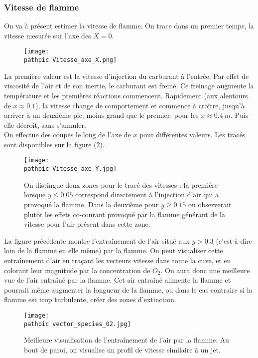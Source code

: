 \documentclass[a4paper,10pt]{article}
\newcommand\pathpic{/home/nsaura/Documents/new_doc/Latex_files/Pic/BE_combustion/}
\newcommand{\cad}{c'est-à-dire}
\newcommand\darker{\color{Maroon}}
\newcommand\black{\color{black}}
\begin{document}
{\darker \subsubsection*{Vitesse de flamme} \black
On va à présent estimer la vitesse de flamme. On trace dans un premier temps, la vitesse mesurée sur l'axe des $X=0$.

\begin{figure}[ht!]
\centering
\texttt{[image: \\pathpic Vitesse\_axe\_X.png]}
\caption{}
\label{}
\end{figure}

La première valeur est la vitesse d'injection du carburant à l'entrée. Par effet de viscosité de l'air et de son inertie, le carburant est freiné. Ce freinage augmente la température et les premières réactions commencent. Rapidement (aux alentours de $x \approx 0.1$), la vitesse change de comportement et commence à croître, jusqu'à arriver à un deuxième pic, moins grand que le premier, pour les $x \approx 0.4 \ m$. Puis elle décroît, sans s'annuler.\\
 On effectue des coupes le long de l'axe de $x$ pour différentes valeurs. Les tracés sont disponibles sur la figure (\ref{densite_vitesse}).
 
 \pagebreak
 \begin{figure}[ht!]
 \centering
 \texttt{[image: \\pathpic Vitesse\_axe\_Y.jpg]}
 \caption{On distingue deux zones pour le tracé des vitesses : la première lorsque $y \leq 0.05$ correspond directement à l'injection d'air qui a provoqué la flamme. Dans la deuxième pour $y \geq 0.15$ on observerait plutôt les effets co-courant provoqué par la flamme générant de la vitesse pour l'air présent dans cette zone.} 
 \label{densite_vitesse}
 \end{figure}
 
 \noindent La figure précédente montre l'entraînement de l'air situé aux $y > 0.3$ (\cad $ $ loin de la flamme en elle même) par la flamme. On peut visualiser cette entraînement d'air en traçant les vecteurs vitesse dans toute la cuve, et en colorant leur magnitude par la concentration de $O_2$. On aura donc une meilleure vue de l'air entraîné par la flamme. Cet air entraîné alimente la flamme et pourrait même augmenter la longueur de la flamme, ou dans le cas contraire si la flamme est trop turbulente, créer des zones d'extinction.
 
  \begin{figure}[ht!]
 \centering
 \texttt{[image: \\pathpic vector\_species\_02.jpg]}
 \caption{Meilleure visualisation de l'entraînement de l'air par la flamme. Au bout de paroi, on visualise un profil de vitesse similaire à un jet.}
 \label{vector_species}
 \end{figure}
 
}
\end{document}
